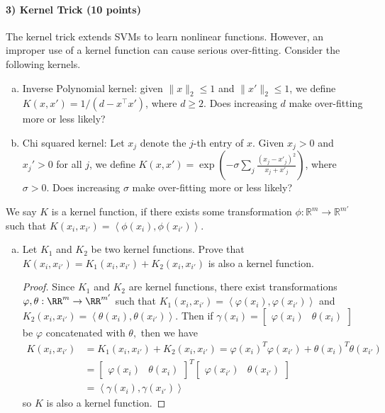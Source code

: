 \documentclass{article}
\begin{document}
\paragraph{3) Kernel Trick (10 points)}
The kernel trick extends SVMs to learn nonlinear functions. However, an improper use of a kernel function can cause serious over-fitting. Consider the following kernels.
\begin{enumerate}[(a)]
	\item Inverse Polynomial kernel: given $\|x\|_2\leq 1$ and $\|x'\|_2\leq 1$, we define $K(x, x') = 1/(d-x^\top x')$, where $d\geq 2$. Does increasing $d$ make over-fitting more or less likely?

	\item Chi squared kernel: Let $x_j$ denote the $j$-th entry of $x$. Given $x_j>0$ and $x_j'>0$ for all $j$, we define $K(x, x') = \exp\left(-\sigma\sum_j\frac{(x_j-x'_j)^2}{x_j+x'_j}\right)$, where $\sigma>0$. Does increasing $\sigma$ make over-fitting more or less likely?

\end{enumerate}
We say $K$ is a kernel function, if there exists some transformation $\phi:\mathbb{R}^m\rightarrow \mathbb{R}^{m'}$ such that $K(x_i,x_{i'}) = \left<\phi(x_i),\phi(x_{i'})\right>$.
\begin{enumerate}[(c)]
	\item Let $K_1$ and $K_2$ be two kernel functions. Prove that $K(x_i,x_{i'}) = K_1(x_i,x_{i'}) + K_2(x_i,x_{i'})$ is also a kernel function.
		\begin{proof}
			Since $K_1$ and $K_2$ are kernel functions, there exist transformations $\varphi, \theta:\RR^m\to\RR^{m'}$ such that $K_1(x_i, x_{i'}) = \left< \varphi(x_i), \varphi(x_{i'})\right>$ and $K_2(x_i, x_{i'}) = \left< \theta(x_i), \theta(x_{i'})\right>.$ Then if $\gamma(x_i)=\begin{bmatrix}
				\varphi(x_i) & \theta(x_i)
			\end{bmatrix}$ be $\varphi$ concatenated with $\theta,$ then we have
			\begin{align*}
				K(x_i, x_{i'}) &= K_1(x_i, x_{i'}) + K_2(x_i, x_{i'}) = \varphi(x_i)^T \varphi(x_{i'}) + \theta(x_i)^T\theta(x_{i'}) \\
				&= \begin{bmatrix}
					\varphi(x_i) & \theta(x_i)
				\end{bmatrix}^T \begin{bmatrix}
					\varphi(x_{i'}) & \theta(x_{i'})
				\end{bmatrix} \\
				&= \left< \gamma(x_i), \gamma(x_{i'})\right>
			\end{align*}
			so $K$ is also a kernel function.
		\end{proof}
\end{enumerate}
\end{document}

